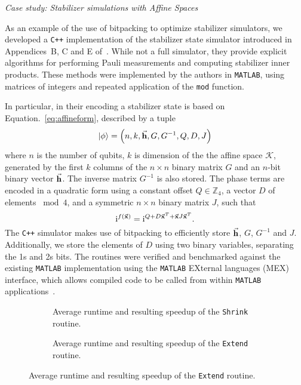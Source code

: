 \large{\itshape{Case study: Stabilizer simulations with Affine Spaces}}\par
As an example of the use of bitpacking to optimize stabilizer simulators, we developed a \texttt{C++} implementation of the stabilizer state simulator introduced in Appendices~B, C and E of~\cite{Bravyi2016}. While not a full simulator, they provide explicit algorithms for performing Pauli measurements and computing stabilizer inner products. These methods were implemented by the authors in \texttt{MATLAB}, using matrices of integers and repeated application of the \texttt{mod} function.\par
In particular, in their encoding a stabilizer state is based on Equation.~\ref{eq:affineform}, described by a tuple
\[\ket{\phi} = \left(n, k, \va{h}, G, G^{-1}, Q, D, J\right)\]
where $n$ is the number of qubits, $k$ is dimension of the the affine space $\mathcal{K}$, generated by the first $k$ columns of the $n\times n$ binary matrix $G$ and an $n$-bit binary vector $\va{h}$. The inverse matrix $G^{-1}$ is also stored. The phase terms are encoded in a quadratic form using a constant offset $Q\in\mathbb{Z}_{4}$, a vector $D$ of elements $\bmod{4}$, and a symmetric $n\times n$ binary matrix $J$, such that
\[\mathrm{i}^{f(\va{x})} = \mathrm{i}^{Q + D\va{x}^{T} + \va{x}J\va{x}^{T}}.\]
The \texttt{C++} simulator makes use of bitpacking to efficiently store $\va{h}$, $G$, $G^{-1}$ and $J$. Additionally, we store the elements of $D$ using two binary variables, separating the 1s and 2s bits. The routines were verified and benchmarked against the existing \texttt{MATLAB} implementation using the \texttt{MATLAB} EXternal languages (MEX) interface, which allows compiled code to be called from within \texttt{MATLAB} applications~\cite{MEXRef}.\par
\begin{figure}[p]
\centering
\caption{Figures showing the performance of the \texttt{MATLAB} and \texttt{C++} implementations of a stabilize simulator based on Affine Spaces.}\label{fig:affine_timings}
\begin{subfigure}[t]{0.9\textwidth}
    \begin{scaletikzpicturetowidth}{\textwidth}
        
    \end{scaletikzpicturetowidth}
    \caption{Average runtime and resulting speedup of the \texttt{Shrink} routine.}
\end{subfigure}
\begin{subfigure}[t]{0.9\textwidth}
    \caption{Average runtime and resulting speedup of the \texttt{Extend} routine.}
    \begin{scaletikzpicturetowidth}{\textwidth}
        
    \end{scaletikzpicturetowidth}
\end{subfigure}
\end{figure}
